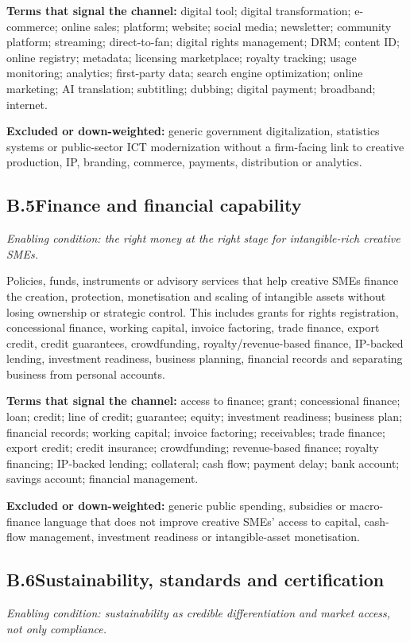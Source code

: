 \textbf{Terms that signal the channel:} digital tool; digital transformation; e-commerce; online sales; platform; website; social media; newsletter; community platform; streaming; direct-to-fan; digital rights management; DRM; content ID; online registry; metadata; licensing marketplace; royalty tracking; usage monitoring; analytics; first-party data; search engine optimization; online marketing; AI translation; subtitling; dubbing; digital payment; broadband; internet.

\textbf{Excluded or down-weighted:} generic government digitalization, statistics systems or public-sector ICT modernization without a firm-facing link to creative production, IP, branding, commerce, payments, distribution or analytics.

\subsection*{B.5\quad Finance and financial capability}
\emph{Enabling condition: the right money at the right stage for intangible-rich creative SMEs.}

Policies, funds, instruments or advisory services that help creative SMEs finance the creation, protection, monetisation and scaling of intangible assets without losing ownership or strategic control. This includes grants for rights registration, concessional finance, working capital, invoice factoring, trade finance, export credit, credit guarantees, crowdfunding, royalty/revenue-based finance, IP-backed lending, investment readiness, business planning, financial records and separating business from personal accounts.

\textbf{Terms that signal the channel:} access to finance; grant; concessional finance; loan; credit; line of credit; guarantee; equity; investment readiness; business plan; financial records; working capital; invoice factoring; receivables; trade finance; export credit; credit insurance; crowdfunding; revenue-based finance; royalty financing; IP-backed lending; collateral; cash flow; payment delay; bank account; savings account; financial management.

\textbf{Excluded or down-weighted:} generic public spending, subsidies or macro-finance language that does not improve creative SMEs' access to capital, cash-flow management, investment readiness or intangible-asset monetisation.

\subsection*{B.6\quad Sustainability, standards and certification}
\emph{Enabling condition: sustainability as credible differentiation and market access, not only compliance.}

